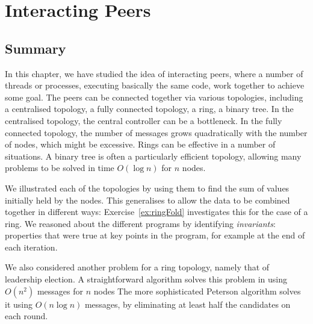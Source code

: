 \chapter{Interacting Peers}
\label{chap:interacting-peers}



\section{Summary}

In this chapter, we have studied the idea of interacting peers, where a number
of threads or processes, executing basically the same code, work together to
achieve some goal.  The peers can be connected together via various
topologies, including a centralised topology, a fully connected topology, a
ring, a binary tree.  In the centralised topology,
the central controller can be a bottleneck.  In the fully connected topology,
the number of messages grows quadratically with the number of nodes, which
might be excessive.  Rings can be effective in a number of situations.  A
binary tree is often a particularly efficient topology, allowing many problems
to be solved in time $O(\log n)$ for $n$ nodes.

We illustrated each of the topologies by using them to find the sum of
values initially held by the nodes.  This generalises to allow the data to be
combined together in different ways: Exercise~\ref{ex:ringFold} investigates
this for the case of a ring.
We reasoned about the different programs by identifying \emph{invariants}:
properties that were true at key points in the program, for example at the end
of each iteration. 

We also considered another problem for a ring topology, namely that of
leadership election.  A straightforward algorithm solves this problem in using
$O(n^2)$ messages for $n$ nodes  The more sophisticated Peterson algorithm
solves it using $O(n \log n)$ messages, by eliminating at least half the
candidates on each round.

